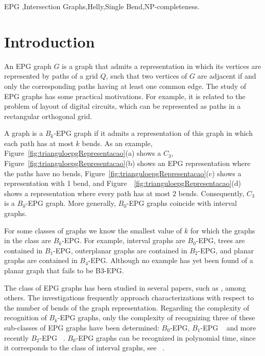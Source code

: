 \documentclass[preprint,12pt]{elsarticle} %
\begin{document}
\begin{frontmatter}
\begin{keyword}
EPG \sep Intersection Graphs\sep Helly\sep Single Bend\sep NP-completeness.


\end{keyword}

\end{frontmatter}


\section{Introduction}

An EPG graph $G$ is a graph that admits a representation in which its vertices are represented by paths of a grid $Q$, such that two vertices of $G$ are adjacent if and only the corresponding paths having at least one common edge. The study of EPG graphs has some practical motivations. For example, it is related to the problem of layout of digital circuits, which can be represented as paths in a rectangular orthogonal grid.

A graph is a $ B_k$-EPG graph if it admits a representation of this graph in which each path has at most $k$ bends. As an example, Figure~\ref{fig:trianguloepgRepresentacao}(a) shows a $C_3$, Figure~\ref{fig:trianguloepgRepresentacao}(b) shows an EPG representation where the paths have no bends, Figure~\ref{fig:trianguloepgRepresentacao}(c) shows a representation with 1 bend, and Figure~~\ref{fig:trianguloepgRepresentacao}(d) shows a representation where every path has at most 2 bends. Consequently, $C_3$ is a $B_0$-EPG graph. More generally, $B_0$-EPG graphs coincide with interval graphs.

For some classes of graphs we know the smallest value of $k$ for which the graphs in the class are $B_k$-EPG. For example, interval graphs are $B_0$-EPG, trees are contained in $ B_1$-EPG, outerplanar graphs are contained in $B_2$-EPG, and planar graphs are contained in $ B_4 $-EPG. Although no example has yet been found of a planar graph that fails to be B3-EPG.

The class of EPG graphs has been studied in several papers, such as \citep{golumbic2009, alcon2016, cohen2014, Asinowski2009, martin2017, heldt2014}, among others. The investigations frequently approach characterizations with respect to the number of bends of the graph representation. Regarding the complexity of recognition of $B_k$-EPG graphs, only the complexity of recognizing three of these sub-classes of EPG graphs have been determined: $ B_0$-EPG, $ B_1$-EPG ~\citep{heldt2014} and more recently $B_2$-EPG ~\citep {martin2017}.  $ B_0$-EPG graphs can be recognized in polynomial time, since it corresponds to the class of interval graphs, see ~\citep{booth1976}. 
\end{document}
